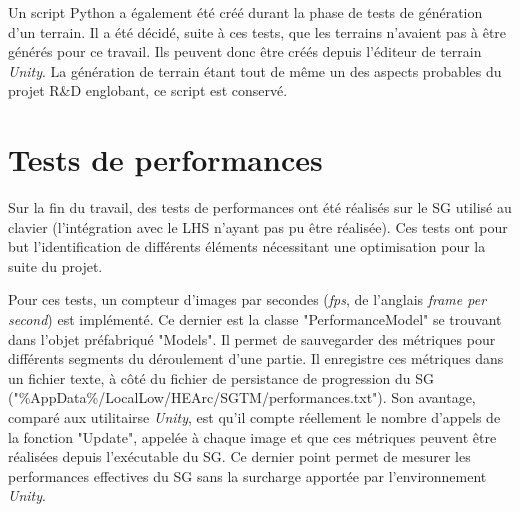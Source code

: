 		Un script Python \cite{python_website} a également été créé durant la phase de tests de génération d'un terrain. Il a été décidé, suite à ces tests, que les terrains n'avaient pas à être générés pour ce travail. Ils peuvent donc être créés depuis l'éditeur de terrain \textit{Unity}. La génération de terrain étant tout de même un des aspects probables du projet R\&D englobant, ce script est conservé.

\section{Tests de performances}
	\label{sResTests}
	Sur la fin du travail, des tests de performances ont été réalisés sur le SG utilisé au clavier (l'intégration avec le LHS n'ayant pas pu être réalisée). Ces tests ont pour but l'identification de différents éléments nécessitant une optimisation pour la suite du projet.
	 
	Pour ces tests, un compteur d'images par secondes (\textit{fps}, de l'anglais \textit{frame per second}) est implémenté. Ce dernier est la classe "PerformanceModel" se trouvant dans l'objet préfabriqué "Models". Il permet de sauvegarder des métriques pour différents segments du déroulement d'une partie. Il enregistre ces métriques dans un fichier texte, à côté du fichier de persistance de progression du SG ("\%AppData\%/LocalLow/HEArc/SGTM/performances.txt"). Son avantage, comparé aux utilitairse \textit{Unity}, est qu'il compte réellement le nombre d'appels de la fonction "Update", appelée à chaque image \cite{Unity50Tips} et que ces métriques peuvent être réalisées depuis l'exécutable du SG. Ce dernier point permet de mesurer les performances effectives du SG sans la surcharge apportée par l'environnement \textit{Unity}.
	\\
	
